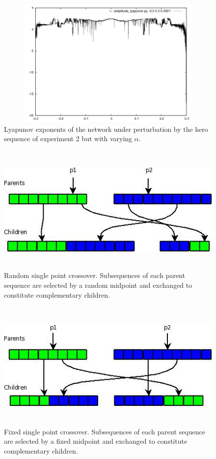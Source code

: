\documentclass[12pt]{article}
\begin{document}
\begin{figure}[htb]
\begin{center}
\includegraphics[height=2.5in,width=4.5in]{images/big_lyapunov.png}
\caption{Lyapunov exponents of the network under perturbation by the hero sequence of experiment 2 but with varying $\alpha$.}
\end{center}
\end{figure}



\begin{figure}[htb]
\begin{center}
\includegraphics[height=2.5in,width=4.5in]{images/single_point_crossover.jpeg}
\caption{Random single point crossover.
    Subsequences of each parent sequence are selected by a random midpoint and exchanged to constitute complementary children.
}
\end{center}
\end{figure}

\begin{figure}[htb]
\begin{center}
\includegraphics[height=2.5in,width=4.5in]{images/fixed_point_crossover.jpeg}
\caption{Fixed single point crossover.  Subsequences of each parent sequence are selected by a fixed midpoint and exchanged to constitute complementary children.}
\end{center}
\end{figure}
\end{document}
